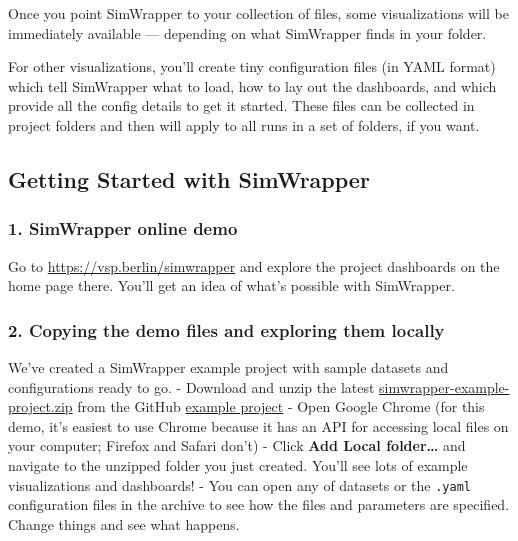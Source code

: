 Once you point SimWrapper to your collection of files, some
visualizations will be immediately available --- depending on what
SimWrapper finds in your folder.

For other visualizations, you'll create tiny configuration files (in
YAML format) which tell SimWrapper what to load, how to lay out the
dashboards, and which provide all the config details to get it started.
These files can be collected in project folders and then will apply to
all runs in a set of folders, if you want.

\hypertarget{getting-started-with-simwrapper}{%
\subsection{Getting Started with
SimWrapper}\label{getting-started-with-simwrapper}}

\hypertarget{simwrapper-online-demo}{%
\subsubsection{1. SimWrapper online demo}\label{simwrapper-online-demo}}

Go to \url{https://vsp.berlin/simwrapper} and explore the project
dashboards on the home page there. You'll get an idea of what's possible
with SimWrapper.

\hypertarget{copying-the-demo-files-and-exploring-them-locally}{%
\subsubsection{2. Copying the demo files and exploring them
locally}\label{copying-the-demo-files-and-exploring-them-locally}}

We've created a SimWrapper example project with sample datasets and
configurations ready to go. - Download and unzip the latest
\href{https://github.com/simwrapper/simwrapper-example-project/archive/refs/heads/main.zip}{simwrapper-example-project.zip}
from the GitHub
\href{https://github.com/simwrapper/simwrapper-example-project}{example
project} - Open Google Chrome (for this demo, it's easiest to use Chrome
because it has an API for accessing local files on your computer;
Firefox and Safari don't) - Click \textbf{Add Local folder\ldots{}} and
navigate to the unzipped folder you just created. You'll see lots of
example visualizations and dashboards! - You can open any of datasets or
the \texttt{.yaml} configuration files in the archive to see how the
files and parameters are specified. Change things and see what happens.

